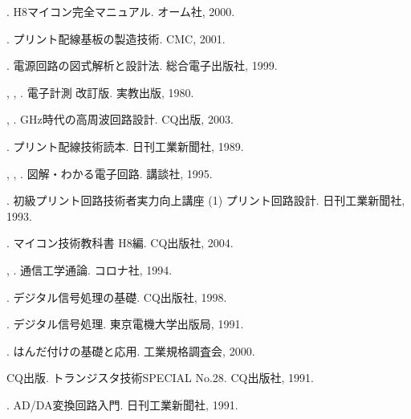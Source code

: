 \begin{hissu}
\begin{thebibliography}{10}
{}{}.
\newblock H8マイコン完全マニュアル.
\newblock オーム社, 2000.

{}{}.
\newblock プリント配線基板の製造技術.
\newblock CMC, 2001.

{}{}.
\newblock 電源回路の図式解析と設計法.
\newblock 総合電子出版社, 1999.

{}{},
  {}{},
  {}{}.
\newblock 電子計測 改訂版.
\newblock 実教出版, 1980.

{}{},
  {}{}.
\newblock GHz時代の高周波回路設計.
\newblock CQ出版, 2003.

{}{}.
\newblock プリント配線技術読本.
\newblock 日刊工業新聞社, 1989.

{}{},
  {}{},
  {}{}.
\newblock 図解・わかる電子回路.
\newblock 講談社, 1995.

{}{}.
\newblock 初級プリント回路技術者実力向上講座 (1) プリント回路設計.
\newblock 日刊工業新聞社, 1993.

{}{}.
\newblock マイコン技術教科書 H8編.
\newblock CQ出版社, 2004.

{}{},
  {}{}.
\newblock 通信工学通論.
\newblock コロナ社, 1994.

{}{}.
\newblock デジタル信号処理の基礎.
\newblock CQ出版社, 1998.

{}{}.
\newblock デジタル信号処理.
\newblock 東京電機大学出版局, 1991.

{}{}.
\newblock はんだ付けの基礎と応用.
\newblock 工業規格調査会, 2000.

CQ出版.
\newblock トランジスタ技術SPECIAL No.28.
\newblock CQ出版社, 1991.

{}{}.
\newblock AD/DA変換回路入門.
\newblock 日刊工業新聞社, 1991.

\end{thebibliography}
\end{hissu}
